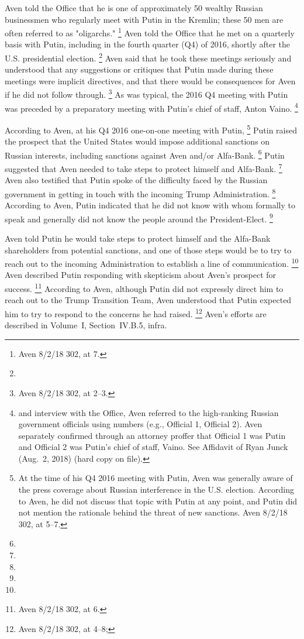 Aven told the Office that he is one of approximately 50 wealthy Russian businessmen who regularly meet with Putin in the Kremlin; these 50 men are often referred to as "oligarchs."%
\footnote{Aven 8/2/18 302, at 7.}
Aven told the Office that he met on a quarterly basis with Putin, including in the fourth quarter (Q4) of 2016, shortly after the U.S. presidential election.%
\footnote{}
Aven said that he took these meetings seriously and understood that any suggestions or critiques that Putin made during these meetings were implicit directives, and that there would be consequences for Aven if he did not follow through.%
\footnote{Aven 8/2/18 302, at 2--3.}
As was typical, the 2016 Q4 meeting with Putin was preceded by a preparatory meeting with Putin's chief of staff, Anton Vaino.%
\footnote{ and interview with the Office, Aven referred to the high-ranking Russian government officials using numbers (e.g., Official 1, Official 2).
Aven separately confirmed through an attorney proffer that Official 1 was Putin and Official 2 was Putin's chief of staff, Vaino.
See Affidavit of Ryan Junck (Aug.~2, 2018) (hard copy on file).}

According to Aven, at his Q4 2016 one-on-one meeting with Putin,%
\footnote{At the time of his Q4 2016 meeting with Putin, Aven was generally aware of the press coverage about Russian interference in the U.S. election.
According to Aven, he did not discuss that topic with Putin at any point, and Putin did not mention the rationale behind the threat of new sanctions.
Aven 8/2/18 302, at 5--7.}
Putin raised the prospect that the United States would impose additional sanctions on Russian interests, including sanctions against Aven and/or Alfa-Bank.%
\footnote{}
Putin suggested that Aven needed to take steps to protect himself and Alfa-Bank.%
\footnote{}
Aven also testified that Putin spoke of the difficulty faced by the Russian government in getting in touch with the incoming Trump Administration.%
\footnote{}
According to Aven, Putin indicated that he did not know with whom formally to speak and generally did not know the people around the President-Elect.%
\footnote{}

Aven
told Putin he would take steps to protect himself and the Alfa-Bank shareholders from potential sanctions, and one of those steps would be to try to reach out to the incoming Administration to establish a line of communication.%
\footnote{}
Aven described Putin responding with skepticism about Aven's prospect for success.%
\footnote{ Aven 8/2/18 302, at 6.}
According to Aven, although Putin did not expressly direct him to reach out to the Trump Transition Team, Aven understood that Putin expected him to try to respond to the concerns he had raised.%
\footnote{Aven 8/2/18 302, at 4--8; }
Aven's efforts are described in Volume~I, Section~IV.B.5, infra.

